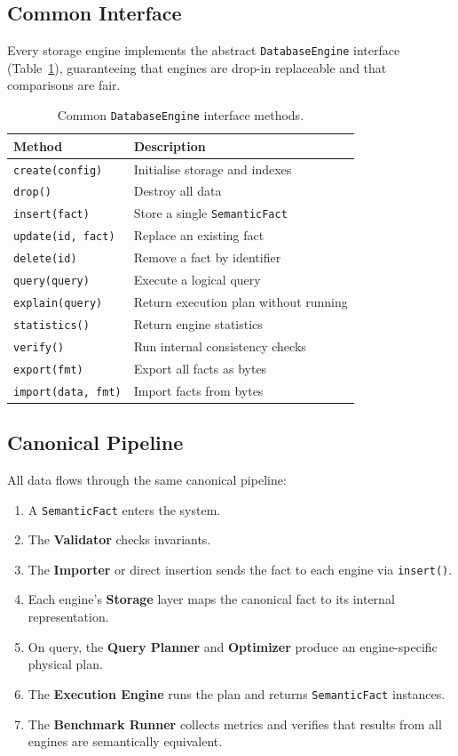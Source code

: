 \subsection{Common Interface}

Every storage engine implements the abstract \texttt{DatabaseEngine}
interface (Table~\ref{tab:common-interface}), guaranteeing that engines
are drop-in replaceable and that comparisons are fair.

\begin{table}[ht]
\centering
\caption{Common \texttt{DatabaseEngine} interface methods.}
\label{tab:common-interface}
\begin{tabular}{@{}ll@{}}
\toprule
Method & Description \\
\midrule
\texttt{create(config)} & Initialise storage and indexes \\
\texttt{drop()} & Destroy all data \\
\texttt{insert(fact)} & Store a single \texttt{SemanticFact} \\
\texttt{update(id, fact)} & Replace an existing fact \\
\texttt{delete(id)} & Remove a fact by identifier \\
\texttt{query(query)} & Execute a logical query \\
\texttt{explain(query)} & Return execution plan without running \\
\texttt{statistics()} & Return engine statistics \\
\texttt{verify()} & Run internal consistency checks \\
\texttt{export(fmt)} & Export all facts as bytes \\
\texttt{import(data, fmt)} & Import facts from bytes \\
\bottomrule
\end{tabular}
\end{table}

\subsection{Canonical Pipeline}

All data flows through the same canonical pipeline:

\begin{enumerate}
    \item A \texttt{SemanticFact} enters the system.
    \item The \textbf{Validator} checks invariants.
    \item The \textbf{Importer} or direct insertion sends the fact to
        each engine via \texttt{insert()}.
    \item Each engine's \textbf{Storage} layer maps the canonical fact
        to its internal representation.
    \item On query, the \textbf{Query Planner} and \textbf{Optimizer}
        produce an engine-specific physical plan.
    \item The \textbf{Execution Engine} runs the plan and returns
        \texttt{SemanticFact} instances.
    \item The \textbf{Benchmark Runner} collects metrics and verifies
        that results from all engines are semantically equivalent.
\end{enumerate}
